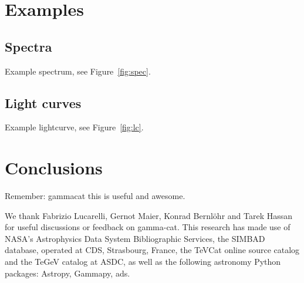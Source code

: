 \documentclass[11pt,twoside]{article}
\begin{document}
\section{Examples}

\subsection{Spectra}

Example spectrum, see Figure~\ref{fig:spec}.


\subsection{Light curves}

Example lightcurve, see Figure~\ref{fig:lc}.


\section{Conclusions}

Remember: gammacat this is useful and awesome.


\acknowledgements We thank Fabrizio Lucarelli, Gernot Maier, Konrad Bernl\"ohr and Tarek Hassan for useful discussions or feedback on gamma-cat.
This research has made use of NASA's Astrophysics Data System Bibliographic Services, the SIMBAD database, operated at CDS, Strasbourg, France, the TeVCat online source catalog and the TeGeV catalog at ASDC, as well as the following astronomy Python packages: Astropy, Gammapy, ads.


\end{document}
